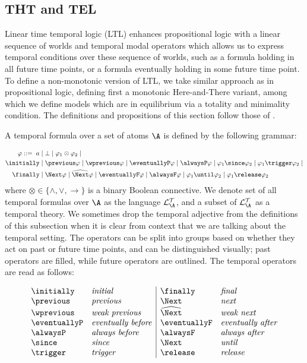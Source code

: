 \subsection{THT and TEL}\label{subsec:tht-tel}

Linear time temporal logic (LTL) enhances propositional logic with a
linear sequence of worlds and temporal modal operators which allows us
to express temporal conditions over these sequence of worlds, such as
a formula holding in all future time points, or a formula eventually
holding in some future time point. To define a non-monotonic version
of LTL, we take similar approach as in propositional logic, defining
first a monotonic Here-and-There variant, among which we define models
which are in equilibrium via a totality and minimality condition. The
definitions and propositions of this section follow those of
\citeauthor{agcadipescscvi20a}\cite{agcadipescscvi20a}.

A temporal formula over a set of atoms $\A$ is defined by the
following grammar:

\begin{align*}
    \varphi ::=   \; a &\mid \bot \mid \varphi_1 \otimes \varphi_2 \mid\\
  \initially &\mid \previous \varphi \mid \wprevious \varphi \mid \eventuallyP \varphi \mid
  \alwaysP \varphi \mid \varphi_1 \since \varphi_2 \mid \varphi_1 \trigger \varphi_2 \mid\\
  \finally &\mid \Next \varphi \mid \wnext \varphi \mid \eventuallyF \varphi \mid
  \alwaysF \varphi \mid \varphi_1 \until \varphi_2 \mid \varphi_1 \release \varphi_2
\end{align*}
where $\otimes \in \{ \wedge, \vee, \to \}$ is a binary Boolean
connective. We denote set of all temporal formulas over $\A$ as the
language $\langat$, and a subset of
$\langat$ as a temporal theory. We sometimes drop the
temporal adjective from the definitions of this subsection when it is
clear from context that we are talking about the temporal setting. The
operators can be split into groups based on whether they act on past
or future time points, and can be distinguished visually; past
operators are filled, while future operators are outlined. The
temporal operators are read as follows:

\[
  \begin{array}{l l|l l}
    \initially & \text{\emph{initial}} & \finally & \text{\emph{final}}\\
    \previous & \text{\emph{previous}} & \Next & \text{\emph{next}}\\
    \wprevious & \text{\emph{weak previous}} & \wnext & \text{\emph{weak next}}\\
    \eventuallyP & \text{\emph{eventually before}} & \eventuallyF & \text{\emph{eventually after}}\\
    \alwaysP & \text{\emph{always before}} & \alwaysF & \text{\emph{always after}}\\
    \since & \text{\emph{since}} & \Next & \text{\emph{until}}\\
    \trigger & \text{\emph{trigger}} & \release & \text{\emph{release}}
\end{array}
\]

